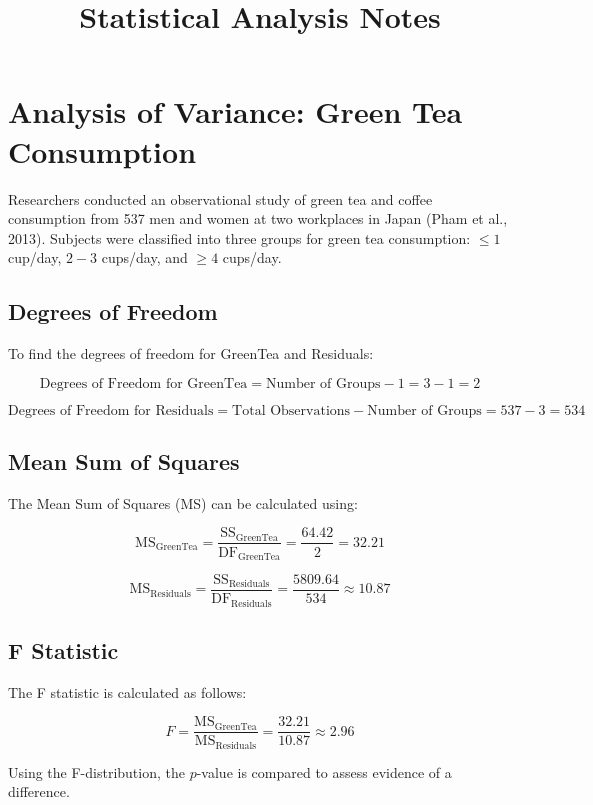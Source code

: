 \documentclass{article}
\title{Statistical Analysis Notes}
\author{}
\date{}
\begin{document}
\maketitle

\section{Analysis of Variance: Green Tea Consumption}

Researchers conducted an observational study of green tea and coffee consumption from 537 men and women at two workplaces in Japan (Pham et al., 2013). Subjects were classified into three groups for green tea consumption: \( \leq 1 \) cup/day, \( 2-3 \) cups/day, and \( \geq 4 \) cups/day.

\subsection{Degrees of Freedom}

To find the degrees of freedom for GreenTea and Residuals:

\[
\text{Degrees of Freedom for GreenTea} = \text{Number of Groups} - 1 = 3 - 1 = 2
\]

\[
\text{Degrees of Freedom for Residuals} = \text{Total Observations} - \text{Number of Groups} = 537 - 3 = 534
\]

\subsection{Mean Sum of Squares}

The Mean Sum of Squares (MS) can be calculated using:

\[
\text{MS}_{\text{GreenTea}} = \frac{\text{SS}_{\text{GreenTea}}}{\text{DF}_{\text{GreenTea}}} = \frac{64.42}{2} = 32.21
\]

\[
\text{MS}_{\text{Residuals}} = \frac{\text{SS}_{\text{Residuals}}}{\text{DF}_{\text{Residuals}}} = \frac{5809.64}{534} \approx 10.87
\]

\subsection{F Statistic}

The F statistic is calculated as follows:

\[
F = \frac{\text{MS}_{\text{GreenTea}}}{\text{MS}_{\text{Residuals}}} = \frac{32.21}{10.87} \approx 2.96
\]

Using the F-distribution, the \( p \)-value is compared to assess evidence of a difference. 
\end{document}
